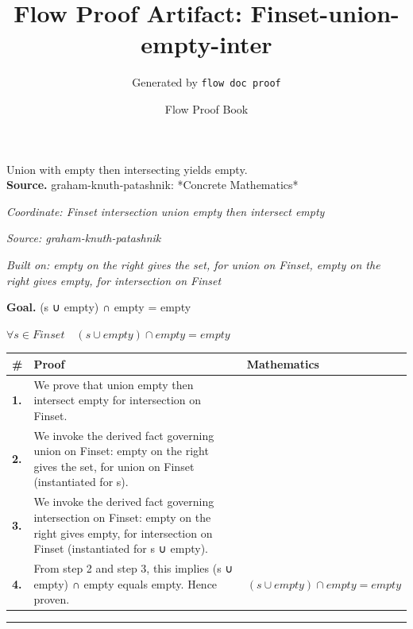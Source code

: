 \documentclass[11pt]{article}
\title{Flow Proof Artifact: Finset-union-empty-inter}
\author{Generated by \texttt{flow doc proof}}
\date{Flow Proof Book}
\theoremstyle{definition}
\begin{document}
\maketitle
Union with empty then intersecting yields empty.\\[0.5em]
\textbf{Source.} graham-knuth-patashnik: *Concrete Mathematics*\\[0.5em]
\bigskip
{}\par
\smallskip\noindent\textit{Coordinate: Finset \cdot intersection \cdot union empty then intersect empty}\par
\smallskip\noindent\textit{Source: graham-knuth-patashnik}\par
\smallskip\noindent\textit{Built on: empty on the right gives the set, for union on Finset, empty on the right gives empty, for intersection on Finset}\par
\medskip
\noindent\textbf{Goal.} (s ∪ empty) ∩ empty = empty\par
\noindent$\displaystyle \forall s \in Finset\quad (s ∪ empty) ∩ empty = empty$\par
\medskip
\noindent
\begin{tabular}{@{} >{\raggedright\arraybackslash}p{} >{\raggedright\arraybackslash}p{} >{\raggedleft\arraybackslash}p{} @{}}
\textbf{\#} & \textbf{Proof} & \textbf{Mathematics} \\
\midrule
\textbf{1.} & We prove that union empty then intersect empty for intersection on Finset. & \\[0.45em]
\textbf{2.} & We invoke the derived fact governing union on Finset: empty on the right gives the set, for union on Finset (instantiated for s). & \\[0.45em]
\textbf{3.} & We invoke the derived fact governing intersection on Finset: empty on the right gives empty, for intersection on Finset (instantiated for s ∪ empty). & \\[0.45em]
\textbf{4.} & From step 2 and step 3, this implies (s ∪ empty) ∩ empty equals empty. Hence proven. & $\displaystyle (s ∪ empty) ∩ empty = empty$ \\[0.45em]
\bottomrule
\end{tabular}
\label{thm:Finset-intersection-union_empty_then_intersect_empty}
\par\medskip\hrule
\end{document}

